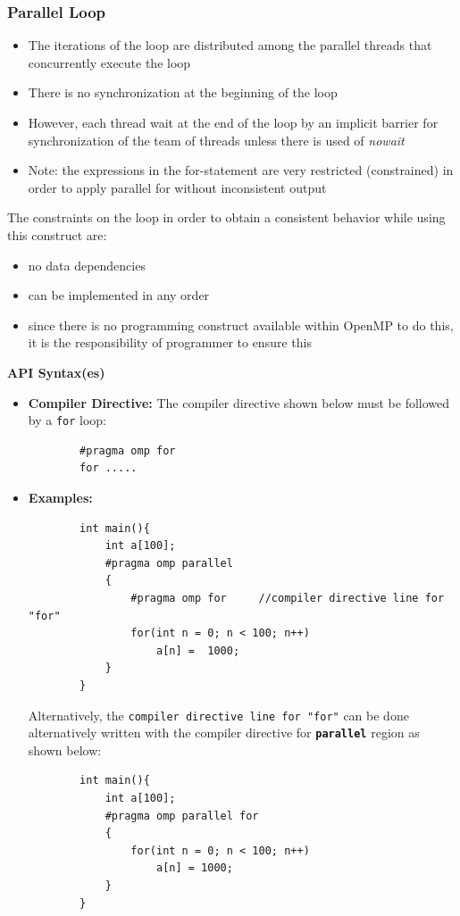 \documentclass[12pt, a4paper]{report}
\begin{document}
\subsubsection{Parallel Loop}
\begin{itemize}
    \item The iterations of the loop are distributed among the parallel threads that concurrently execute the loop
    \item There is no synchronization at the beginning of the loop
    \item However, each thread wait at the end of the loop by an implicit barrier for synchronization of the team of threads unless there is
          used of {\textit{nowait}}
    \item Note: the expressions in the for-statement are very restricted (constrained) in order to apply parallel for without inconsistent
          output
\end{itemize}

The constraints on the loop in order to obtain a consistent behavior while using this construct are:
\begin{itemize}
    \item no data dependencies
    \item can be implemented in any order
    \item since there is no programming construct available within OpenMP to do this, it is the responsibility of programmer to ensure this
\end{itemize}

{\bfseries{API Syntax(es)}}
\begin{itemize}
    \item {\bfseries{Compiler Directive:}} The compiler directive shown below must be followed by a {\texttt{for}} loop:
    \begin{verbatim}
        #pragma omp for
        for .....
    \end{verbatim}
    \item {\bfseries{Examples:}}
    \begin{verbatim}
        int main(){
            int a[100];
            #pragma omp parallel
            {
                #pragma omp for     //compiler directive line for "for"
                for(int n = 0; n < 100; n++)
                    a[n] =  1000;
            }
        }
    \end{verbatim}
    Alternatively, the {\texttt{compiler directive line for "for"}} can be done alternatively written with the compiler directive for 
    {\texttt{\textbf{parallel}}} region as shown below:
    \begin{verbatim}
        int main(){
            int a[100];
            #pragma omp parallel for
            {
                for(int n = 0; n < 100; n++)
                    a[n] = 1000;
            }
        }
    \end{verbatim}
\end{itemize}
\end{document}
